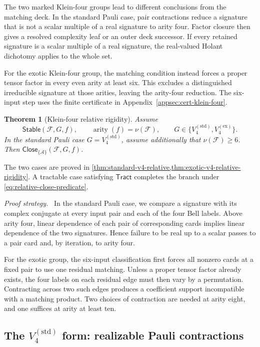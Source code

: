\documentclass[11pt,letterpaper,onecolumn]{article}
\theoremstyle{plain}
\newtheorem{theorem}{Theorem}[section]
\theoremstyle{definition}
\theoremstyle{remark}
\newenvironment{proofstrategy}{\par\noindent\textit{Proof strategy.}\ }{\par}
\newcommand{\cF}{\mathcal F}
\newcommand{\cA}{\mathscr A}
\newcommand{\Tract}{\mathsf{Tract}}
\newcommand{\KleinStd}{{V_4^{(\mathrm{std})}}}
\newcommand{\KleinEx}{{V_4^{(\mathrm{ex})}}}
\newcommand{\Stable}{\mathsf{Stable}}
\newcommand{\Close}{\mathsf{Close}}
\newcommand{\arity}{\operatorname{arity}}
\begin{document}
The two marked Klein-four groups lead to different conclusions from the
matching deck. In the standard Pauli case, pair contractions reduce a
signature that is not a scalar multiple of a real signature to arity four.
Factor closure then gives a resolved complexity leaf or an outer deck
successor. If every retained signature is a scalar multiple of a real
signature, the real-valued Holant dichotomy applies to the whole set.

For the exotic Klein-four group, the matching condition instead forces
a proper tensor factor in every even arity at least six.
This excludes a distinguished irreducible signature at those arities,
leaving the arity-four reduction. The six-input step uses the finite
certificate in Appendix~\ref{appsec:cert-klein-four}.

\begin{theorem}[Klein-four relative rigidity]
\label{thm:v4-relative}
Assume
\[
 \Stable(\cF,G,f),\qquad \arity(f)=\nu(\cF),
 \qquad G\in\{\KleinStd,\KleinEx\}.
\]
In the standard Pauli case \(G=\KleinStd\), assume additionally that
\(\nu(\cF)\ge6\).  Then
\(\Close_{\{\cA\}}(\cF,G,f)\).
\end{theorem}

The two cases are proved in
\cref{thm:standard-v4-relative,thm:exotic-v4-relative-rigidity}.
A tractable case satisfying \(\Tract\) completes the branch under
\cref{eq:relative-close-predicate}.

\begin{proofstrategy}
In the standard Pauli case, we compare a signature with its complex
conjugate at every input pair and each of the four Bell labels. Above
arity four, linear dependence of each pair of corresponding cards implies
linear dependence of the two signatures. Hence failure to be real up to
a scalar passes to a pair card and, by iteration, to arity four.

For the exotic group, the six-input classification first forces all
nonzero cards at a fixed pair to use one residual matching. Unless a
proper tensor factor already exists, the four labels on each residual
edge must then vary by a permutation. Contracting across two such edges
produces a coefficient support incompatible with a matching product.
Two choices of contraction are needed at arity eight, and one suffices
at arity at least ten.
\end{proofstrategy}

\subsection{The \texorpdfstring{\(\KleinStd\)}{V4 (std)} form: realizable Pauli contractions}
\label{proofsec:v4}
\label{proofsubsec:v4-pauli-calculus}
\end{document}
